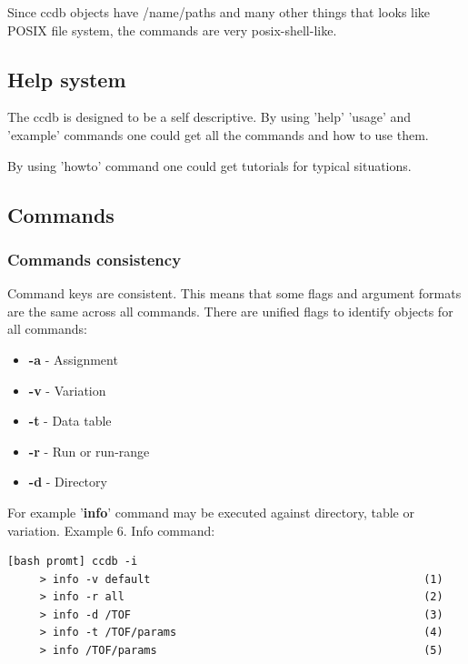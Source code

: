 \documentclass{article}
\begin{document}
Since ccdb objects have /name/paths and many other things that looks like
POSIX file system, the commands are very posix-shell-like.


\subsection{Help system}

The ccdb is designed to be a self descriptive. By using 'help' 'usage' and 'example' commands
one could get all the commands and how to use them.

By using 'howto' command one could get tutorials for typical situations.


\subsection{Commands}

\subsubsection{Commands consistency}

Command keys are consistent. This means that some flags and argument formats
are the same across all commands. There are unified flags to identify objects for all commands:
\begin{itemize}
  \item \textbf{-a} - Assignment
  \item \textbf{-v} - Variation
  \item \textbf{-t} - Data table
  \item \textbf{-r} - Run or run-range
  \item \textbf{-d} - Directory
\end{itemize}

For example '\textbf{info}' command may be executed against directory, table or variation.
Example 6. Info command:
\begin{verbatim}
[bash promt] ccdb -i
     > info -v default                                          (1)
     > info -r all                                              (2)
     > info -d /TOF                                             (3)
     > info -t /TOF/params                                      (4)
     > info /TOF/params                                         (5)
\end{verbatim}
\end{document}
